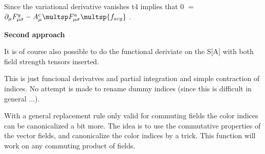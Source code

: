 Since the variational derivative vanishes t4 implies that 0 \(=\) \({{\partial }_{\mu }}F_{\mu \sigma }^{g}-A_{\mu }^{c}\multsp F_{\mu \sigma }^{a}\multsp
{f_{acg}}\) .

{\bfseries Second approach}

It is of course also possible to do the functional deriviate on the S[A] with both field strength tensors inserted.





This is just funcional derivatves and partial integration and simple contraction of indices. No attempt is made to rename dummy indices
  (since this is difficult in general ...).

With a general replacement rule only valid for commuting fields the color indices can be canonicalized a bit more. The idea is to use the
  commutative properties of the vector fields, and canonicalize the color indices by a trick. This function will work on any commuting
  product of fields.



